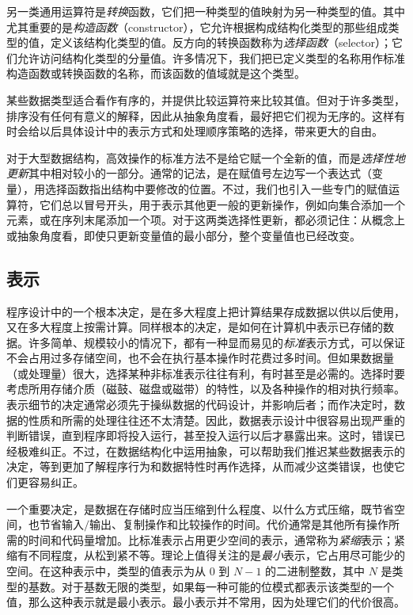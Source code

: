 另一类通用运算符是\textit{转换}函数，它们把一种类型的值映射为另一种类型的值。其中尤其重要的是\textit{构造函数}（constructor），它允许根据构成结构化类型的那些组成类型的值，定义该结构化类型的值。反方向的转换函数称为\textit{选择函数}（selector）；它们允许访问结构化类型的分量值。许多情况下，我们把已定义类型的名称用作标准构造函数或转换函数的名称，而该函数的值域就是这个类型。

某些数据类型适合看作有序的，并提供比较运算符来比较其值。但对于许多类型，排序没有任何有意义的解释，因此从抽象角度看，最好把它们视为无序的。这样有时会给以后具体设计中的表示方式和处理顺序策略的选择，带来更大的自由。

对于大型数据结构，高效操作的标准方法不是给它赋一个全新的值，而是\textit{选择性地更新}其中相对较小的一部分。通常的记法，是在赋值号左边写一个表达式（变量），用选择函数指出结构中要修改的位置。不过，我们也引入一些专门的赋值运算符，它们总以冒号开头，用于表示其他更一般的更新操作，例如向集合添加一个元素，或在序列末尾添加一个项。对于这两类选择性更新，都必须记住：从概念上或抽象角度看，即使只更新变量值的最小部分，整个变量值也已经改变。

\subsection{表示}

程序设计中的一个根本决定，是在多大程度上把计算结果存成数据以供以后使用，又在多大程度上按需计算。同样根本的决定，是如何在计算机中表示已存储的数据。许多简单、规模较小的情况下，都有一种显而易见的\textit{标准}表示方式，可以保证不会占用过多存储空间，也不会在执行基本操作时花费过多时间。但如果数据量（或处理量）很大，选择某种非标准表示往往有利，有时甚至是必需的。选择时要考虑所用存储介质（磁鼓、磁盘或磁带）的特性，以及各种操作的相对执行频率。表示细节的决定通常必须先于操纵数据的代码设计，并影响后者；而作决定时，数据的性质和所需的处理往往还不太清楚。因此，数据表示设计中很容易出现严重的判断错误，直到程序即将投入运行，甚至投入运行以后才暴露出来。这时，错误已经极难纠正。不过，在数据结构化中运用抽象，可以帮助我们推迟某些数据表示的决定，等到更加了解程序行为和数据特性时再作选择，从而减少这类错误，也使它们更容易纠正。

一个重要决定，是数据在存储时应当压缩到什么程度、以什么方式压缩，既节省空间，也节省输入$/$输出、复制操作和比较操作的时间。代价通常是其他所有操作所需的时间和代码量增加。比标准表示占用更少空间的表示，通常称为\textit{紧缩}表示；紧缩有不同程度，从松到紧不等。理论上值得关注的是\textit{最小}表示，它占用尽可能少的空间。在这种表示中，类型的值表示为从 0 到 $N - 1$ 的二进制整数，其中 $N$ 是类型的基数。对于基数无限的类型，如果每一种可能的位模式都表示该类型的一个值，那么这种表示就是最小表示。最小表示并不常用，因为处理它们的代价很高。


